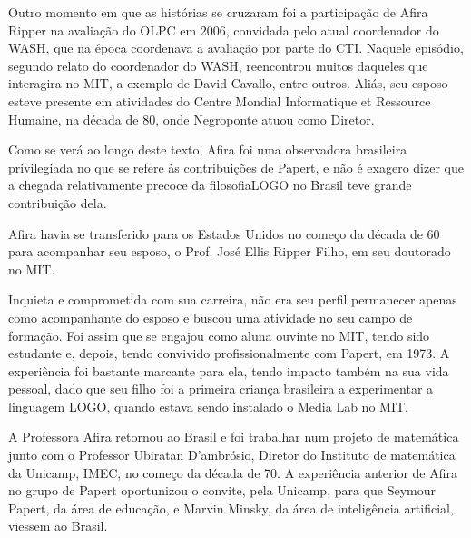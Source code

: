 \documentclass[
12pt,		%
openright,	%
twoside,  %
a4paper,			%
chapter=TITLE,		%
english,			%
french,				%
spanish,			%
brazil				%
]{USPSC-classe/USPSC}
\begin{document}
Outro momento em que as hist\'orias se cruzaram foi a participa\c{c}\~ao de Afira Ripper na avalia\c{c}\~ao do OLPC em 2006, convidada pelo atual coordenador do WASH, que na \'epoca coordenava a avalia\c{c}\~ao por parte do CTI. Naquele epis\'odio, segundo relato do coordenador do WASH, reencontrou muitos daqueles que interagira no MIT, a exemplo de David Cavallo, entre outros. Ali\'as, seu esposo esteve presente em atividades do Centre Mondial Informatique et Ressource Humaine, na d\'ecada de 80, onde Negroponte atuou como Diretor.










Como se ver\'a ao longo deste texto, Afira foi uma observadora brasileira privilegiada no que se refere \`as contribui\c{c}\~oes de Papert, e n\~ao \'e exagero dizer que a chegada relativamente precoce da \textquotedbl filosofia\textquotedbl  LOGO no Brasil teve grande contribui\c{c}\~ao dela.










Afira havia se transferido para os Estados Unidos no come\c{c}o da d\'ecada de 60 para acompanhar seu esposo, o Prof. Jos\'e Ellis Ripper Filho, em seu doutorado no MIT.










Inquieta e comprometida com sua carreira, n\~ao era seu perfil permanecer apenas como acompanhante do esposo e buscou uma atividade no seu campo de forma\c{c}\~ao. Foi assim que se engajou como aluna ouvinte no MIT, tendo sido estudante e, depois, tendo convivido profissionalmente com Papert, em 1973. A experi\^encia foi bastante marcante para ela, tendo impacto tamb\'em na sua vida pessoal, dado que seu filho foi a primeira crian\c{c}a brasileira a experimentar a linguagem LOGO, quando estava sendo instalado o Media Lab no MIT.










A Professora Afira retornou ao Brasil e foi trabalhar num projeto de matem\'atica junto com o Professor Ubiratan D’ambr\'osio, Diretor do Instituto de matem\'atica da Unicamp, IMEC, no come\c{c}o da d\'ecada de 70. A experi\^encia anterior de Afira no grupo de Papert oportunizou o convite, pela Unicamp, para que Seymour Papert, da \'area de educa\c{c}\~ao, e Marvin Minsky, da \'area de intelig\^encia artificial, viessem ao Brasil.
\end{document}
